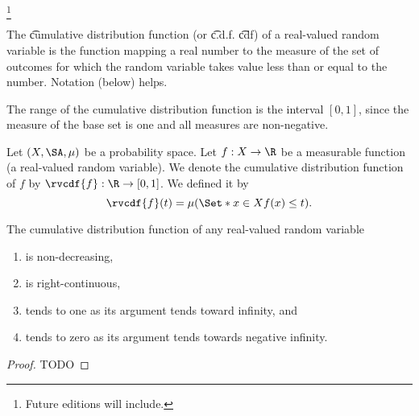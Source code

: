 
\footnote{Future editions will include.}



The \t{cumulative distribution function} (or \t{c.d.f.} \t{cdf}) of a real-valued random variable is the function mapping a real number to the measure of the set of outcomes for which the random variable takes value less than or equal to the number.
Notation (below) helps.

The range of the cumulative distribution function is the interval $[0, 1]$, since the measure of the base set is one and all measures are non-negative.




Let $(X, \SA, \mu)$ be a probability space.
Let $f: X \to \R$ be a measurable function (a real-valued random variable).
We denote the cumulative distribution function of $f$ by $\rvcdf{f}: \R \to [0, 1]$.
We defined it by
\[
  \rvcdf{f}(t) = \mu(\Set*{x \in X}{f(x) \leq t}).
\]


\begin{prop}
The cumulative distribution function
of any real-valued random variable
\begin{enumerate}

  \item
    is non-decreasing,

  \item
    is right-continuous,

  \item
    tends to one as its argument
    tends toward infinity, and

  \item
    tends to zero as its argument
    tends towards negative infinity.
\end{enumerate}
  \begin{proof}
    TODO
  \end{proof}
\end{prop}
